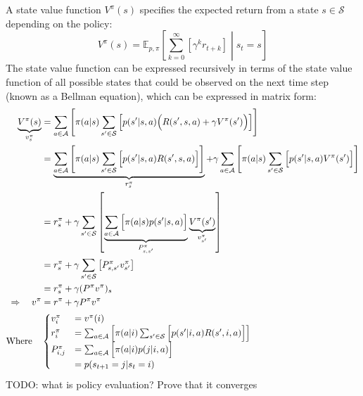 A state value function $V^\pi(s)$ specifies the expected return from a state $s\in\mathcal{S}$ depending on the policy:
\begin{equation}
    V^\pi(s) = \mathbb{E}_{p, \pi} \left[ \sum_{k = 0}^\infty{\left[ \gamma^k r_{t+k} \right]} \middle\vert s_t=s \right]
\end{equation}
The state value function can be expressed recursively in terms of the state value function of all possible states that could be observed on the next time step (known as a Bellman equation), which can be expressed in matrix form:
\begin{align*}
    \underbrace{V^\pi(s)}_{v^\pi_s} &= \sum_{a\in\mathcal{A}}{\left[ \pi(a\vert s) \sum_{s'\in\mathcal{S}}{\left[ p(s'\vert s, a) \Bigl( R(s', s, a) + \gamma V^\pi(s') \Bigr) \right]} \right]} \\
    &= \underbrace{\sum_{a\in\mathcal{A}}{\left[ \pi(a\vert s) \sum_{s'\in\mathcal{S}}{\Bigl[ p(s'\vert s, a) R(s', s, a) \Bigr]} \right]}}_{r^\pi_s} + \gamma\sum_{a\in\mathcal{A}}{\left[ \pi(a\vert s) \sum_{s'\in\mathcal{S}}{\Bigl[ p(s'\vert s, a) V^\pi(s') \Bigr]} \right]} \\
    &= r^\pi_s + \gamma\sum_{s'\in\mathcal{S}}{\left[ \underbrace{\sum_{a\in\mathcal{A}}{\Bigl[ \pi(a\vert s) p(s'\vert s, a) \Bigr]}}_{P^\pi_{s, s'}} \underbrace{V^\pi(s')}_{v^\pi_{s'}} \right]} \\
    &= r^\pi_s + \gamma\sum_{s'\in\mathcal{S}}{\left[ P^\pi_{s, s'} v^\pi_{s'} \right]} \\
    &= r^\pi_s + \gamma  (P^\pi v^\pi)_s \\
    \Rightarrow \quad v^\pi &= r^\pi + \gamma P^\pi v^\pi \\
    \text{Where} \quad & \begin{cases}
        v^\pi_i &= v^\pi(i) \\
        r^\pi_i &= \sum_{a\in\mathcal{A}}{\left[ \pi(a\vert i) \sum_{s'\in\mathcal{S}}{\Bigl[ p(s'\vert i, a) R(s', i, a) \Bigr]} \right]} \\
        P^\pi_{i, j} &= \sum_{a\in\mathcal{A}}{\Bigl[ \pi(a\vert i) p(j\vert i, a) \Bigr]} \\
        &= p(s_{t+1}=j\vert s_t=i)
    \end{cases}
\end{align*}
TODO: what is policy evaluation? Prove that it converges
